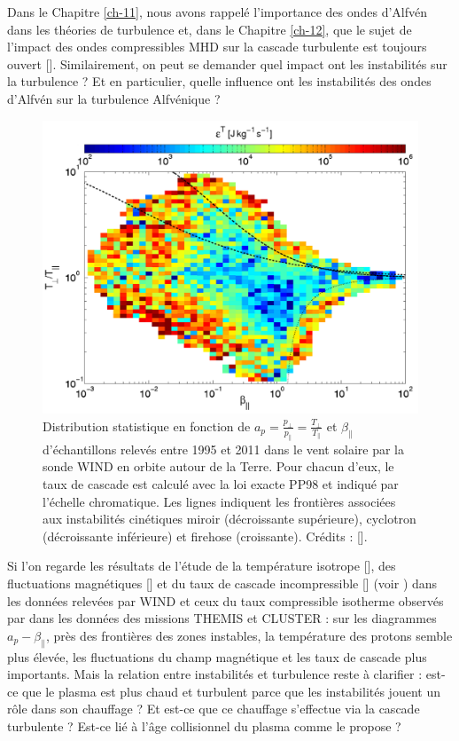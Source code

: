 Dans le Chapitre \ref{ch-11}, nous avons rappelé l'importance des ondes d'Alfvén dans les théories de turbulence et, dans le Chapitre \ref{ch-12}, que le sujet de l'impact des ondes compressibles \ac{MHD} sur la cascade turbulente est toujours ouvert [\cite{brodiano_spatiotemporal_2021}]. Similairement, on peut se demander quel impact ont les instabilités sur la turbulence ? Et en particulier, quelle influence ont les instabilités des ondes d'Alfvén sur la turbulence Alfvénique ? 
\begin{figure}[!ht]
 \centering
\includegraphics[width=0.7\linewidth,trim=0cm 0cm 0cm 0cm, clip=true]{./Part_2/images/osman_2013}
\caption{Distribution statistique en fonction de $a_p = \frac{p_{\perp}}{p_{\parallel}} =  \frac{T_{\perp}}{T_{\parallel}}$ et $\beta_{\parallel}$ d'échantillons relevés entre 1995 et 2011 dans le vent solaire par la sonde \acs{WIND} en orbite autour de la Terre. Pour chacun d'eux, le taux de cascade est calculé avec la loi exacte PP98 et indiqué par l'échelle chromatique. Les lignes indiquent les frontières associées aux instabilités cinétiques miroir (décroissante supérieure), cyclotron (décroissante inférieure) et firehose (croissante). Crédits : [\cite{osman_proton_2013}]. }
\label{fig:diag_osman}
\end{figure}
Si l'on regarde les résultats de l'étude de la température isotrope [\cite{liu_thermodynamic_2006}], des fluctuations magnétiques [\cite{bale_magnetic_2009}] et du taux de cascade incompressible [\cite{osman_proton_2013}] (voir ) dans les données relevées par \acs{WIND} et ceux du taux compressible isotherme observés par \cite{hadid_compressible_2018} dans les données des missions \acs{THEMIS} et \acs{CLUSTER} : sur les diagrammes $a_p-\beta_{\parallel}$, près des frontières des zones instables, la température des protons semble plus élevée, les fluctuations du champ magnétique et les taux de cascade plus importants. Mais la relation entre instabilités et turbulence reste à clarifier : est-ce que le plasma est plus chaud et turbulent parce que les instabilités jouent un rôle dans son chauffage ? Et est-ce que ce chauffage s'effectue via la cascade turbulente ? Est-ce lié à l'âge collisionnel du plasma comme le propose \cite{bale_magnetic_2009} ?

